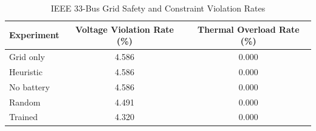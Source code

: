 \begin{table}[h]
\centering
\caption{IEEE 33-Bus Grid Safety and Constraint Violation Rates}
\label{table:grid_safety}
\begin{tabular}{lcc}
\hline
Experiment & Voltage Violation Rate (\%) & Thermal Overload Rate (\%) \\
\hline
Grid only & 4.586 & 0.000 \\
Heuristic & 4.586 & 0.000 \\
No battery & 4.586 & 0.000 \\
Random & 4.491 & 0.000 \\
Trained & 4.320 & 0.000 \\
\hline
\end{tabular}
\end{table}
